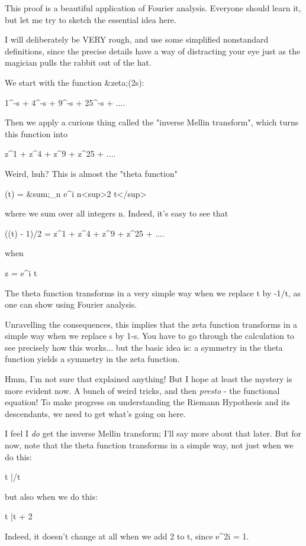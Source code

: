 This proof is a beautiful application of Fourier analysis.  Everyone
should learn it, but let me try to sketch the essential idea here.

I will deliberately be VERY rough, and use some simplified nonstandard
definitions, since the precise details have a way of distracting your 
eye just as the magician pulls the rabbit out of the hat.

We start with the function &zeta;(2s):

1^{-s} + 4^{-s} + 9^{-s} + 25^{-s} + ....

Then we apply a curious thing called the "inverse
Mellin transform", which turns 
this function into 

z^{1}  + z^{4}  + z^{9}  + z^{25} + ....

Weird, huh?  This is almost the "theta function"

\theta (t) = &sum;_{n} e^{\pi  i n<sup>2} t</sup>

where we sum over all integers n.  Indeed, it's easy to see that

(\theta (t) - 1)/2 = z^{1} + z^{4} + z^{9} + 
z^{25} + .... 

when 

z = e^{\pi  i t}

The theta function transforms in a very simple way when we replace
t by -1/t, as one can show using Fourier analysis.

Unravelling the consequences, this implies that the zeta function 
transforms in a simple way when we replace s by 1-s.  You have to
go through the calculation to see precisely how this works... but 
the basic idea is: a symmetry in the theta function yields a symmetry
in the zeta function.

Hmm, I'm not sure that explained anything!  But I hope at least the 
mystery is more evident now.  A bunch of weird tricks, and then 
\emph{presto} - 
the functional equation!  To make progress on understanding the Riemann 
Hypothesis and its descendants, we need to get what's going on here.  

I feel I \emph{do} get the inverse
Mellin transform; I'll say more about that later.  
But for now, note that the theta function transforms in a simple way, not 
just when we do this:
 
t |/t

but also when we do this:

t |\to  t + 2

Indeed, it doesn't change at all when we add 2 to t, since e^{2\pi  i} = 1.   

